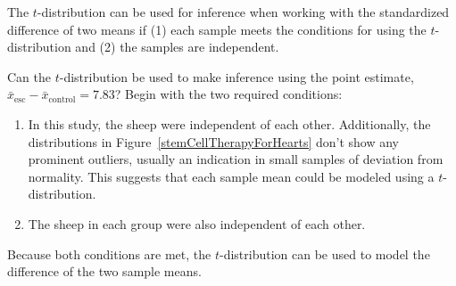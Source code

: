 
\begin{termBox}{
\label{ConditionsForTwoSampleTDist}The $t$-distribution can be used for inference when working with the standardized difference of two means if (1) each sample meets the conditions for using the $t$-distribution and (2) the samples are independent.}
\end{termBox}

\begin{example}{Can the $t$-distribution be used to make inference using the point estimate, $\bar{x}_{\text{esc}} - \bar{x}_{\text{control}} = 7.83$?}
Begin with the two required conditions:
\begin{enumerate}
\item In this study, the sheep were independent of each other. Additionally, the distributions in Figure~\ref{stemCellTherapyForHearts} don't show any prominent outliers, usually an indication in small samples of deviation from normality. This suggests that each sample mean could be modeled using a $t$-distribution.
\item The sheep in each group were also independent of each other.
\end{enumerate}
Because both conditions are met, the $t$-distribution can be used to model the difference of the two sample means.
\end{example}

